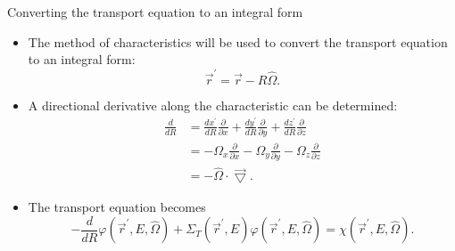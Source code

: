 \documentclass{beamer}
\begin{document}
\begin{frame}{Converting the transport equation to an integral form}

  \begin{itemize}
    \item The method of characteristics will be used to convert the 
      transport equation to an integral form: \newline
      \begin{equation*}
        \vec{r}^{'} = \vec{r} - R\hat{\Omega}.
        \label{eq:characteristic}
      \end{equation*}
    \item A directional derivative along the characteristic can be determined:
      \newline
      \begin{align}
        \frac{d}{dR} & = \frac{dx^{'}}{dR}\frac{\partial}{\partial x} +
        \frac{dy^{'}}{dR}\frac{\partial}{\partial y} +
        \frac{dz^{'}}{dR}\frac{\partial}{\partial z} \nonumber \\
        & = -\Omega_x \frac{\partial}{\partial x} -
        \Omega_y \frac{\partial}{\partial y} -
        \Omega_z \frac{\partial}{\partial z} \nonumber \\
        & = -\hat{\Omega} \cdot \vec{\bigtriangledown}. \nonumber
      \end{align}
    \item The transport equation becomes
      \begin{equation*}
        -\frac{d}{dR}\varphi(\vec{r}^{'},E,\hat{\Omega}) + \Sigma_T(\vec{r}^{'},E)
        \varphi(\vec{r}^{'},E,\hat{\Omega}) =
        \chi(\vec{r}^{'},E,\hat{\Omega}).
        \label{eq:transport_ode}
      \end{equation*}
  \end{itemize}

\end{frame}
\end{document}
